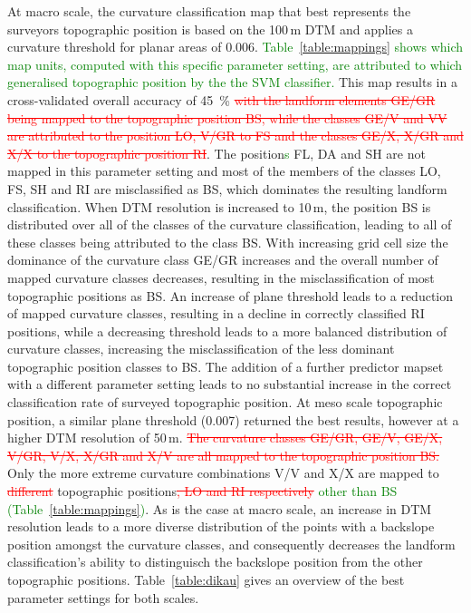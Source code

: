 \documentclass[preprint,12pt,authoryear]{elsarticle}
\begin{document}
 At macro scale, the curvature classification map that best represents the surveyors topographic position is based on the 100\,m DTM and applies a curvature threshold for planar areas of 0.006. \textcolor{green}{Table~\ref{table:mappings} shows which map units, computed with this specific parameter setting, are attributed to which generalised topographic position by the the SVM classifier. } This map results in a cross-validated overall accuracy of 45~\% \textcolor{red}{\sout{with the landform elements GE/GR being mapped to the topographic position BS, while the classes GE/V and VV are attributed to the position LO, V/GR to FS and the classes GE/X, X/GR and X/X to the topographic position RI}}. The position\textcolor{green}{s} FL, DA and SH are not mapped in this parameter setting and most of the members of the classes LO, FS, SH and RI are misclassified as BS, which dominates the resulting landform classification. When DTM resolution is increased to 10\,m, the position BS is distributed over all of the classes of the curvature classification, leading to all of these classes being attributed to the class BS. With increasing grid cell size the dominance of the curvature class GE/GR increases and the overall number of mapped curvature classes decreases, resulting in the misclassification of most topographic positions as BS. An increase of plane threshold leads to a reduction of mapped curvature classes, resulting in a decline in correctly classified RI positions, while a decreasing threshold leads to a more balanced distribution of curvature classes, increasing the misclassification of the less dominant topographic position classes to BS. The addition of a further predictor mapset with a different parameter setting leads to no substantial increase in the correct classification rate of surveyed topographic position.
At meso scale topographic position, a similar plane threshold (0.007) returned the best results, however at a higher DTM resolution of 50\,m. \textcolor{red}{\sout{The curvature classes GE/GR, GE/V, GE/X, V/GR, V/X, X/GR and X/V are all mapped to the topographic position BS.}} Only the more extreme curvature combinations V/V and X/X are mapped to \textcolor{red}{\sout{different}} topographic positions\textcolor{red}{\sout{, LO and RI respectively}} \textcolor{green}{other than BS (Table~\ref{table:mappings})}. As is the case at macro scale, an increase in DTM resolution leads to a more diverse distribution of the points with a backslope position amongst the curvature classes, and consequently decreases the landform classification's ability to distinguisch the backslope position from the other topographic positions. Table~\ref{table:dikau} gives an overview of the best parameter settings for both scales.
\end{document}
